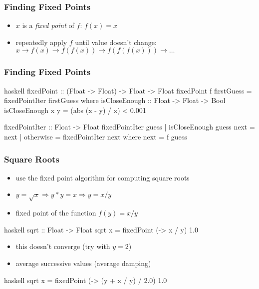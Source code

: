 \documentclass[dvipsnames]{beamer}
\theoremstyle{plain}
\begin{document}
\begin{frame}
  \frametitle{Finding Fixed Points}

  \begin{itemize}
    \item $x$ is a \emph{fixed point} of $f$: $f(x)=x$
    \item repeatedly apply $f$ until value doesn't change:\\
      $x \rightarrow f(x) \rightarrow f(f(x)) \rightarrow f(f(f(x)))
      \rightarrow \ldots$
  \end{itemize}
\end{frame}

\begin{frame}[fragile]
  \frametitle{Finding Fixed Points}

  \begin{exampleblock}{}
    \begin{pygments}{haskell}
fixedPoint :: (Float -> Float) -> Float -> Float
fixedPoint f firstGuess = fixedPointIter firstGuess
  where
    isCloseEnough :: Float -> Float -> Bool
    isCloseEnough x y = (abs (x - y) / x) < 0.001

    fixedPointIter :: Float -> Float
    fixedPointIter guess
      | isCloseEnough guess next = next
      | otherwise                = fixedPointIter next
      where next = f guess
    \end{pygments}
  \end{exampleblock}
\end{frame}

\begin{frame}[fragile]
  \frametitle{Square Roots}

  \begin{itemize}
    \item use the fixed point algorithm for computing square roots
    \item $y = \sqrt{x} \Rightarrow y * y = x \Rightarrow y = x / y$
    \item fixed point of the function $f(y) = x / y$
  \end{itemize}

  \begin{exampleblock}{}
    \begin{pygments}{haskell}
sqrt :: Float -> Float
sqrt x = fixedPoint (\y -> x / y) 1.0
    \end{pygments}
  \end{exampleblock}

  \pause
  \begin{itemize}
    \item this doesn't converge (try with $y = 2$)
    \item average successive values (average damping)
  \end{itemize}

  \begin{exampleblock}{}
    \begin{pygments}{haskell}
sqrt x = fixedPoint (\y -> (y + x / y) / 2.0) 1.0
    \end{pygments}
  \end{exampleblock}
\end{frame}
\end{document}
